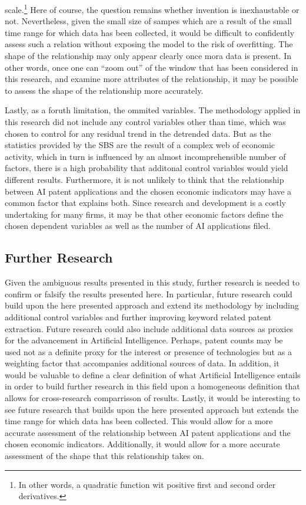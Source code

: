 \documentclass[
  11,
  a4paperpaper,
]{article}
\begin{document}
scale.\footnote{In other words, a quadratic function wit positive first
  and second order derivatives.} Here of course, the question remains
whether invention is inexhaustable or not. Nevertheless, given the small
size of sampes which are a result of the small time range for which data
has been collected, it would be difficult to confidently assess such a
relation without exposing the model to the risk of overfitting. The
shape of the relationship may only appear clearly once mora data is
present. In other words, once one can ``zoom out'' of the window that
has been considered in this research, and examine more attributes of the
relationship, it may be possible to assess the shape of the relationship
more accurately.

Lastly, as a foruth limitation, the ommited variables. The methodology
applied in this research did not include any control variables other
than time, which was chosen to control for any residual trend in the
detrended data. But as the statistics provided by the SBS are the result
of a complex web of economic activity, which in turn is influenced by an
almost incomprehensible number of factors, there is a high probability
that additonal control variables would yield different results.
Furthermore, it is not unlikely to think that the relationship between
AI patent applications and the chosen economic indicators may have a
common factor that explains both. Since research and development is a
costly undertaking for many firms, it may be that other economic factors
define the chosen dependent variables as well as the number of AI
applications filed.

\subsection{Further Research}\label{further-research}

Given the ambiguous results presented in this study, further research is
needed to confirm or falsify the results presented here. In particular,
future research could build upon the here presented approach and extend
its methodology by including additional control variables and further
improving keyword related patent extraction. Future research could also
include additional data sources as proxies for the advancement in
Artificial Intelligence. Perhaps, patent counts may be used not as a
definite proxy for the interest or presence of technologies but as a
weighting factor that accompanies additional sources of data. In
addition, it would be valuable to define a clear definition of what
Artificial Intelligence entails in order to build further research in
this field upon a homogeneous definition that allows for cross-research
comparrisson of results. Lastly, it would be interesting to see future
research that builds upon the here presented approach but extends the
time range for which data has been collected. This would allow for a
more accurate assessment of the relationship between AI patent
applications and the chosen economic indicators. Additionally, it would
allow for a more accurate assessment of the shape that this relationship
takes on.
\end{document}
